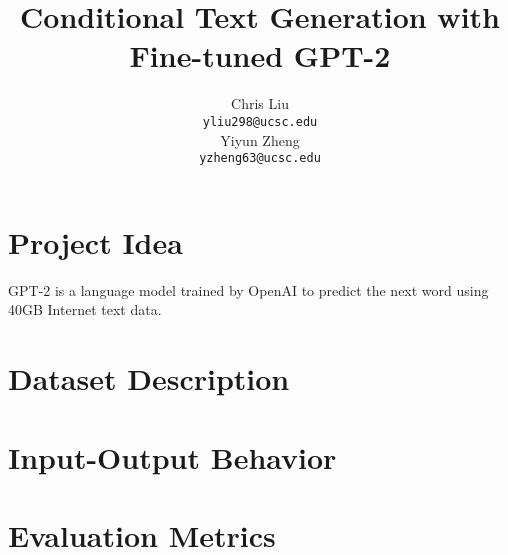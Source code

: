 \documentclass[10pt]{article}
\title{Conditional Text Generation with Fine-tuned GPT-2}
\author{
 Chris Liu \\
    \texttt{yliu298@ucsc.edu} \\
 \And
 Yiyun Zheng \\
    \texttt{yzheng63@ucsc.edu}
}
\begin{document}
\maketitle
\section{Project Idea}

GPT-2 \cite{radford2019language} is a language model trained by OpenAI to predict the next word using 40GB Internet text data. 

\section{Dataset Description}

\section{Input-Output Behavior}

\section{Evaluation Metrics}

\clearpage

\printbibliography 
\end{document}
